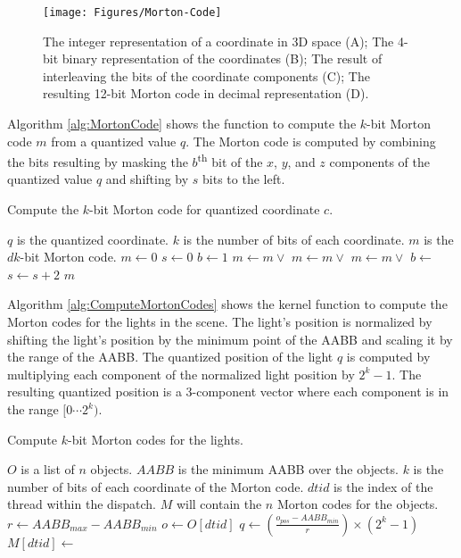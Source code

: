 \begin{figure}[h]
\centering
\texttt{[image: Figures/Morton-Code]}
\decoRule
\caption{The integer representation of a coordinate in 3D space (A); The 4-bit binary representation of the coordinates (B); The result of interleaving the bits of the coordinate components (C); The resulting 12-bit Morton code in decimal representation (D).}
\label{fig:Morton-Code}
\end{figure}

Algorithm \ref{alg:MortonCode} shows the function to compute the $k$-bit Morton code $m$ from a quantized value $q$. The Morton code is computed by combining the bits resulting by masking the $b$\textsuperscript{th} bit of the $x$, $y$, and $z$ components of the quantized value $q$ and shifting by $s$ bits to the left.

\begin{algorithm}[H]
\caption{Compute the $k$-bit Morton code for quantized coordinate $c$.}
\label{alg:MortonCode}
\begin{algorithmic}[1]
\Require $q$ is the quantized coordinate.
\Require $k$ is the number of bits of each coordinate.
\Ensure $m$ is the $dk$-bit Morton code.
\State $m \gets 0$
\State $s \gets 0$
\State $b \gets 1$
\State $m \gets m \vee$ 
\State $m \gets m \vee$ 
\State $m \gets m \vee$ 
\State $b \gets $ 
\State $s \gets s+2$
\EndWhile
\State \Return $m$
\EndFunction
\end{algorithmic}
\end{algorithm}

Algorithm \ref{alg:ComputeMortonCodes} shows the kernel function to compute the Morton codes for the lights in the scene. The light's position is normalized by shifting the light's position by the minimum point of the AABB and scaling it by the range of the AABB. The quantized position of the light $q$ is computed by multiplying each component of the normalized light position by $2^k-1$. The resulting quantized position is a 3-component vector where each component is in the range $[0 \cdots 2^k)$.

\begin{algorithm}[H]
\caption{Compute $k$-bit Morton codes for the lights.}
\label{alg:ComputeMortonCodes}
\begin{algorithmic}[1]
\Require $O$ is a list of $n$ objects.
\Require $AABB$ is the minimum AABB over the objects.
\Require $k$ is the number of bits of each coordinate of the Morton code.
\Require $dtid$ is the index of the thread within the dispatch.
\Ensure $M$ will contain the $n$ Morton codes for the objects.
\State $r \gets AABB_{max} - AABB_{min}$
\State $o \gets O[dtid]$
\State $q \gets \left( \frac{o_{pos} - AABB_{min}}{r} \right) \times \left( 2^k-1 \right)$
\State $M[dtid] \gets$ 
\EndIf
\EndFunction
\end{algorithmic}
\end{algorithm}

